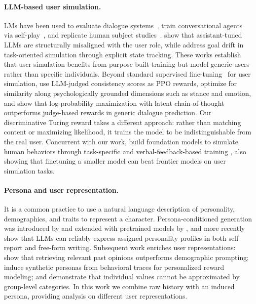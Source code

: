 \documentclass{article} %
\begin{document}
\paragraph{LLM-based user simulation.}
LMs have been used to evaluate dialogue systems~\citep{davidson2023user, sekulic2024simulating, sim2real, humt}, train conversational agents via self-play~\citep{shah2018bootstrapping, abdulhai2025consistently, utility}, and replicate human subject studies~\citep{aher2023using, park2023generative}. \citet{naous2025flipping} show that assistant-tuned LLMs are structurally misaligned with the user role, while \citet{mehri2025goal} address goal drift in task-oriented simulation through explicit state tracking. These works establish that user simulation benefits from purpose-built training but model generic users rather than specific individuals.
Beyond standard supervised fine-tuning~\citep{wolf2019transfertransfo} for user simulation, \citet{abdulhai2025consistently} use LLM-judged consistency scores as PPO rewards, \citet{wu2026humanlm} optimize for similarity along psychologically grounded dimensions such as stance and emotion, and \citet{gandhi2026dialogue} show that log-probability maximization with latent chain-of-thought outperforms judge-based rewards in generic dialogue prediction. Our discriminative Turing reward takes a different approach: rather than matching content or maximizing likelihood, it trains the model to be indistinguishable from the real user. Concurrent with our work, \citet{OdysSim} build foundation models to simulate human behaviors through task-specific and verbal-feedback-based training \citep{verbal_feedback}, also showing that finetuning a smaller model can beat frontier models on user simulation tasks.

\paragraph{Persona and user representation.}
It is a common practice to use a natural language description of personality, demographics, and traits to represent a character. Persona-conditioned generation was introduced by \citet{zhang2018personalizing} and extended with pretrained models by \citet{wolf2019transfertransfo}, and \citet{jiang2024personallm} more recently show that LLMs can reliably express assigned personality profiles in both self-report and free-form writing. Subsequent work enriches user representations: \citet{hwang2023aligning} show that retrieving relevant past opinions outperforms demographic prompting; \citet{ryan2025synthesizeme} induce synthetic personas from behavioral traces for personalized reward modeling; and \citet{jiang2024indievalue} demonstrate that individual values cannot be approximated by group-level categories. In this work we combine raw history with an induced persona, providing analysis on different user representations.
\end{document}
